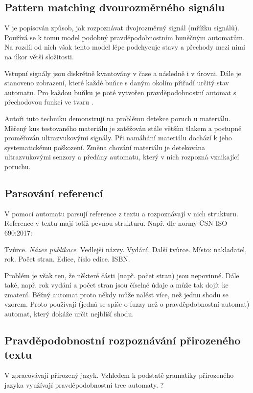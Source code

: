\documentclass[a4paper,10pt]{article}
\begin{document}
\subsection{Pattern matching dvourozměrného signálu}
V \cite{Jin+-WavBasFeaExtUsPrFiStAuPatCla} je popisován způsob, jak rozpoznávat dvojrozměrný signál (mřížku signálů). Používá se k tomu model podobný pravděpodobnostním buněčným automatům. Na rozdíl od nich však tento model lépe podchycuje stavy a přechody mezi nimi na úkor větší složitosti. 

Vstupní signály jsou diskrétně kvantovány v čase a následně i v úrovni. Dále je stanoveno zobrazení, které každé buňce s daným okolím přiřadí určitý stav automatu. Pro každou buňku je poté vytvořen pravděpodobnostní automat s přechodovou funkcí ve tvaru .

Autoři tuto techniku demonstrují na problému detekce poruch u materiálu. Měřený kus testovaného materiálu je zatěžován stále větším tlakem a postupně proměřován ultrazvukovými signály. Při namáhání materiálu dochází k jeho systematickému poškození. Změna chování materiálu je detekována ultrazvukovými senzory a předány automatu, který v nich rozpozná vznikající poruchu.

\subsection{Parsování referencí}


V \cite{Kra+-BibMeExUsiPrFiStTra} pomocí automatu parsují reference z textu a rozpoznávají v nich strukturu. Reference v textu mají totiž pevnou strukturu. Např. dle normy ČSN ISO 690:2017:

Tvůrce. \textit{Název publikace}. Vedlejší názvy. Vydání. Další tvůrce. Místo: nakladatel, rok. Počet stran. Edice, číslo edice. ISBN.

Problém je však ten, že některé části (např. počet stran) jsou nepovinné. Dále také, např. rok vydání a počet stran jsou číselné údaje a může tak dojít ke zmatení. Běžný automat proto někdy může nalést více, než jednu shodu se vzorem. Proto používají  (jedná se spíše o fuzzy než o pravděpdobnostní automat) automat, který dokáže určit nejbliší shodu.

\subsection{Pravděpodobnostní rozpoznávání přirozeného textu}
V \cite{KniGra-OvProTreTraNatLanPro} zpracovávají přirozený jazyk. Vzhledem k podstatě gramatiky přirozeného jazyka využívají pravděpodobnostní tree automaty. ?
\end{document}
